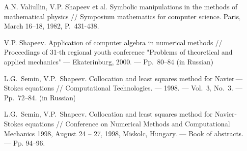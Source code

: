 \documentclass[12pt]{article}
\begin{document}
\begin{thebibliography}{}
A.N. Valiullin, V.P. Shapeev et al. 
Symbolic manipulations in the
methods of mathematical physics //
Symposium mathematics for computer science.
Paris, March 16--18, 1982, P.~431-438.

V.P. Shapeev.
Application of computer algebra in numerical methods //
Proceedings of 31-th regional youth conference "Problems of theoretical
and applied mechanics" --- Ekaterinburg, 2000. --- Pp.~80--84
(in Russian)

  L.G.~Semin, V.P.~Shapeev.
  Collocation and least squares method for Navier\,---\,Stokes equations //
  Computational Technologies. --- 1998. --- Vol.~3, No.~3. --- Pp.~72--84.
  (in Russian)

  L.G.~Semin, V.P.~Shapeev.
  Collocation and least squares method for Navier-Stokes equations //
  Conference on Numerical Methods and Computational Mechanics 1998,
  August 24 -- 27, 1998, Miskolc, Hungary. --- Book of abstracts. ---
  Pp. 94--96. 

\end{thebibliography}
\end{document}
